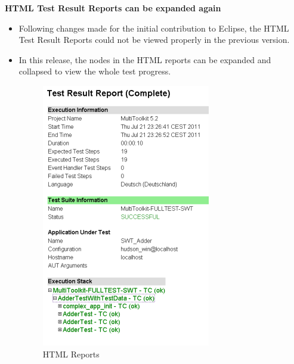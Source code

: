 \textbf{HTML Test Result Reports can be expanded again}
\begin{itemize}
\item Following changes made for the initial contribution to Eclipse, the HTML Test Result Reports could not be viewed properly in the previous version. 
\item In this release, the nodes in the HTML reports can be expanded and collapsed to view the whole test progress. 

\begin{figure}[h]
\begin{center}
\includegraphics{52/ps/HTMLReport}
\caption{HTML Reports}
\label{RNHTMLReport}
\end{center}
\end{figure}
		
\end{itemize}

